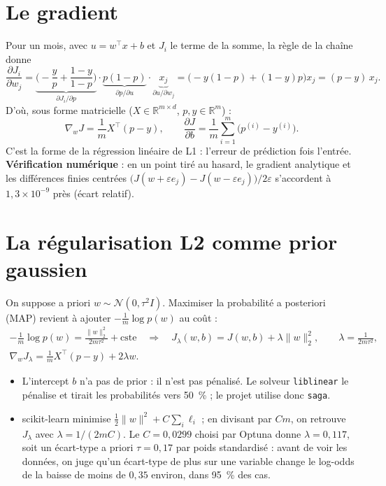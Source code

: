 \documentclass[11pt,a4paper]{article}
\begin{document}
\section{Le gradient}

Pour un mois, avec $u=w^\top x+b$ et $J_i$ le terme de la somme, la règle de la chaîne donne
\[
\frac{\partial J_i}{\partial w_j}
=\underbrace{\Big(-\frac{y}{p}+\frac{1-y}{1-p}\Big)}_{\partial J_i/\partial p}
\cdot\underbrace{p(1-p)}_{\partial p/\partial u}\cdot\underbrace{x_j}_{\partial u/\partial w_j}
=\big(-y(1-p)+(1-y)p\big)x_j=(p-y)\,x_j .
\]
D'où, sous forme matricielle ($X\in\mathbb R^{m\times d}$, $p,y\in\mathbb R^m$) :
\[
\nabla_w J=\frac1m X^\top(p-y),\qquad \frac{\partial J}{\partial b}=\frac1m\sum_{i=1}^m\big(p^{(i)}-y^{(i)}\big).
\]
C'est la forme de la régression linéaire de L1 : l'erreur de prédiction fois l'entrée. \textbf{Vérification
numérique} : en un point tiré au hasard, le gradient analytique et les différences finies centrées
$\big(J(w+\varepsilon e_j)-J(w-\varepsilon e_j)\big)/2\varepsilon$ s'accordent à $1{,}3\times10^{-9}$ près (écart relatif).

\section{La régularisation L2 comme prior gaussien}

On suppose a priori $w\sim\mathcal N(0,\tau^2 I)$. Maximiser la probabilité a posteriori (MAP) revient à ajouter
$-\frac1m\log p(w)$ au coût :
\begin{gather*}
-\frac1m\log p(w)=\frac{\lVert w\rVert_2^2}{2m\tau^2}+\text{cste}
\quad\Longrightarrow\quad
J_\lambda(w,b)=J(w,b)+\lambda\lVert w\rVert_2^2,\qquad \lambda=\frac{1}{2m\tau^2},\\
\nabla_wJ_\lambda=\frac1mX^\top(p-y)+2\lambda w .
\end{gather*}
\begin{itemize}
\item L'intercept $b$ n'a pas de prior : il n'est pas pénalisé. Le solveur \texttt{liblinear} le pénalise et tirait les
probabilités vers 50~\% ; le projet utilise donc \texttt{saga}.
\item scikit-learn minimise $\tfrac12\lVert w\rVert^2+C\sum_i\ell_i$ ; en divisant par $Cm$, on retrouve $J_\lambda$ avec
$\lambda=1/(2mC)$. Le $C=0{,}0299$ choisi par Optuna donne $\lambda=0{,}117$, soit un écart-type a priori
$\tau=0{,}17$ par poids standardisé : avant de voir les données, on juge qu'un écart-type de plus sur une variable change
le log-odds de la baisse de moins de $0{,}35$ environ, dans 95~\% des cas.
\end{itemize}
\end{document}

